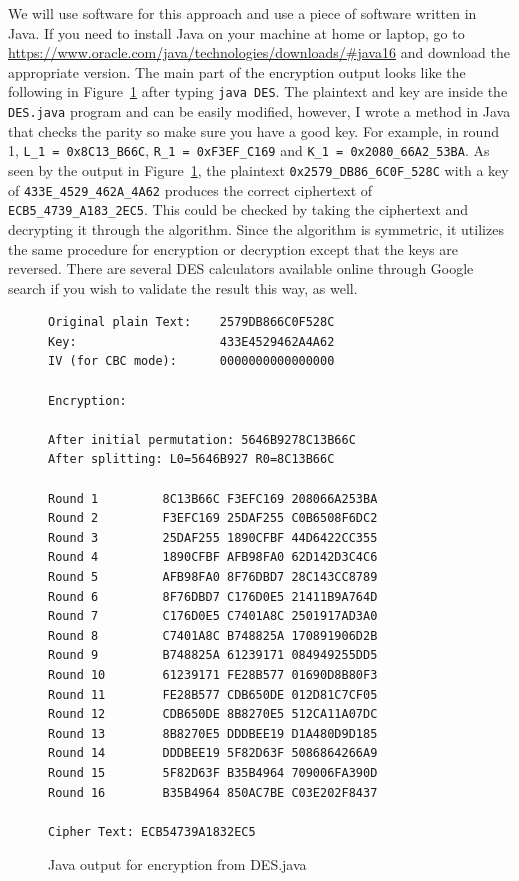 \documentclass{article}
\begin{document}
We will use software for this approach
and use a piece of software written in Java.
If you need
to install Java on your machine at home or laptop, go to
\url{https://www.oracle.com/java/technologies/downloads/#java16} and
download the appropriate version.
The main part of the encryption output looks like the following in
Figure~\ref{des.java} after
typing \verb!java DES!.  The plaintext and
key are inside the \verb!DES.java! program
and can be easily modified, however, I wrote a method in Java that
checks the
parity so make sure you have a good key.  For example, in round 1,
\verb!L_1 = 0x8C13_B66C!, \verb!R_1 = 0xF3EF_C169! and
\verb!K_1 = 0x2080_66A2_53BA!.  As seen by the output in
Figure~\ref{des.java}, the plaintext \verb!0x2579_DB86_6C0F_528C! with
a key of \verb!433E_4529_462A_4A62! produces the correct ciphertext of
\verb!ECB5_4739_A183_2EC5!.
This could be checked by taking the ciphertext and decrypting it
through the algorithm.  Since the algorithm is symmetric, it utilizes
the same procedure for encryption or decryption except that the keys
are reversed.
There are several DES calculators
available online through Google search if you wish to validate the
result this way, as well. 
\begin{figure}
\begin{verbatim}
Original plain Text:    2579DB866C0F528C
Key:                    433E4529462A4A62
IV (for CBC mode):      0000000000000000

Encryption:

After initial permutation: 5646B9278C13B66C
After splitting: L0=5646B927 R0=8C13B66C

Round 1	        8C13B66C F3EFC169 208066A253BA
Round 2	        F3EFC169 25DAF255 C0B6508F6DC2
Round 3	        25DAF255 1890CFBF 44D6422CC355
Round 4	        1890CFBF AFB98FA0 62D142D3C4C6
Round 5	        AFB98FA0 8F76DBD7 28C143CC8789
Round 6	        8F76DBD7 C176D0E5 21411B9A764D
Round 7	        C176D0E5 C7401A8C 2501917AD3A0
Round 8	        C7401A8C B748825A 170891906D2B
Round 9	        B748825A 61239171 084949255DD5
Round 10        61239171 FE28B577 01690D8B80F3
Round 11        FE28B577 CDB650DE 012D81C7CF05
Round 12        CDB650DE 8B8270E5 512CA11A07DC
Round 13        8B8270E5 DDDBEE19 D1A480D9D185
Round 14        DDDBEE19 5F82D63F 5086864266A9
Round 15        5F82D63F B35B4964 709006FA390D
Round 16        B35B4964 850AC7BE C03E202F8437

Cipher Text: ECB54739A1832EC5
\end{verbatim}
\caption{Java output for encryption from DES.java}
\label{des.java}
\end{figure}
\end{document}

